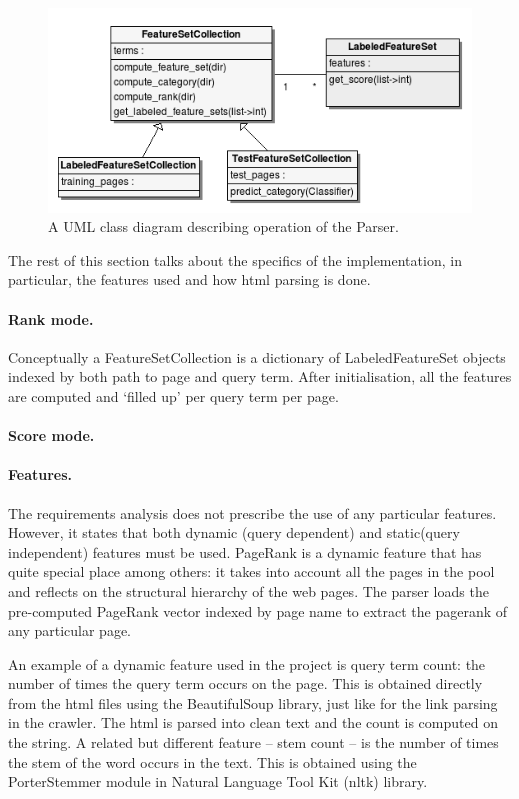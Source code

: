 \documentclass[12pt,twoside,notitlepage]{report}
\begin{document}
\begin{figure}
\centering
\includegraphics[scale=0.5]{figs/uml.png}
\caption{A UML class diagram describing operation of the Parser.}
\label{uml}
\end{figure}

The rest of this section talks about the specifics of the implementation, in
particular, the features used and how html parsing is done.

\paragraph{Rank mode.}
Conceptually a FeatureSetCollection is a dictionary of LabeledFeatureSet
objects indexed by both path to page and  query term. After initialisation, all
the features are computed and `filled up' per query term per page.

\paragraph{Score mode.}
\paragraph{Features.}


The requirements analysis does not prescribe the use of any particular
features. However, it states that both dynamic (query dependent) and
static(query independent) features must be used. PageRank is a dynamic feature
that has quite special place among others: it takes into account all the pages
in the pool and reflects on the structural hierarchy of the web pages. 
The parser loads the pre-computed PageRank vector indexed by page name to
extract the pagerank of any particular page.

An example of a dynamic feature used in the project is query term count: the
number of times the query term occurs on the page. This is obtained directly
from the html files using the BeautifulSoup library, just like for the link
parsing in the crawler. The html is parsed into clean text and the count is
computed on the string.
A related but different feature -- stem count -- is the number of times the
stem of the word occurs in the text. This is obtained using the PorterStemmer
module in Natural Language Tool Kit (nltk) library.
\end{document}
